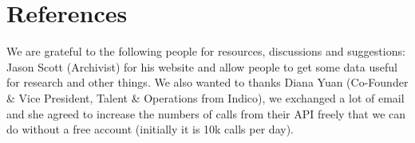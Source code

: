 \documentclass{acmtog} %
\begin{document}

\section{References}

\begin{acks}
We are grateful to the following people for resources, discussions and suggestions: Jason Scott (Archivist) for his website and allow people to get some data useful for research and other things. We also wanted to thanks Diana Yuan (Co-Founder & Vice President, Talent & Operations from Indico), we exchanged a lot of email and she agreed to increase the numbers of calls from their API freely that we can do without a free account (initially it is 10k calls per day).
\end{acks}




\end{document}
